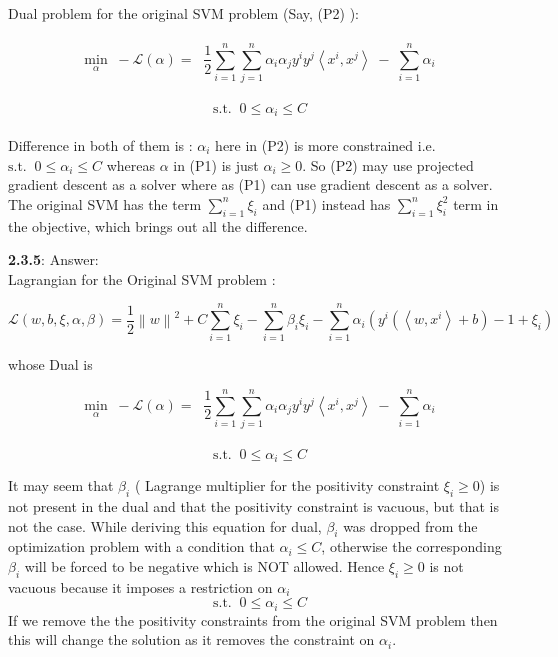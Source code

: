 \documentclass[a4paper,11pt]{article}
\begin{document}
\begin{mlsolution}
Dual problem for the original SVM problem (Say, (P2) ):\\\\
\[
\underset{\alpha}{\text{min}} \;\; - \mathcal{L}\left ( \alpha \right ) = \; \;\frac{1}{2}\sum_{i=1}^{n}\sum_{j=1}^{n}\alpha_{i}\alpha_{j}y^{i}y^{j}\left \langle x^{i}, x^{j} \right \rangle \;-\; \sum_{i=1}^{n}\alpha_{i}
\]\\
\[\text{s.t.} \;\;0 \leq \alpha_{i} \leq C\]\\

Difference in both of them is : $\alpha_{i}$ here in (P2) is more constrained i.e. $\text{s.t.} \;\;0 \leq \alpha_{i} \leq C$ whereas $\alpha$ in (P1) is just $\alpha_{i} \geq 0$. So (P2) may use projected gradient descent as a solver where as (P1) can use gradient descent as a solver.\\

The original SVM has the term $\sum_{i=1}^{n}\xi_{i}$ and (P1) instead has $\sum_{i=1}^{n}\xi_{i}^{2}$ term in the objective, which brings out all the difference.
\newpage

\textbf{2.3.5}: Answer:\\

Lagrangian for the Original SVM problem : 

\[
\mathcal{L}\left ( w, b, \xi, \alpha, \beta \right ) =
\frac{1}{2} \left \| w \right \|^{2} + C \sum_{i=1}^{n} \xi_{i} - \sum_{i=1}^{n} \beta_{i}\xi_{i} - \sum_{i=1}^{n} \alpha_i\left ( y^{i}\left ( \left \langle w, x^{i} \right \rangle + b \right ) - 1 + \xi_{i} \right )
\]

whose Dual is 

\[
\underset{\alpha}{\text{min}} \;\; - \mathcal{L}\left ( \alpha \right ) = \; \;\frac{1}{2}\sum_{i=1}^{n}\sum_{j=1}^{n}\alpha_{i}\alpha_{j}y^{i}y^{j}\left \langle x^{i}, x^{j} \right \rangle \;-\; \sum_{i=1}^{n}\alpha_{i}
\]\\
\[\text{s.t.} \;\;0 \leq \alpha_{i} \leq C\]

It may seem that $\beta_{i}$ ( Lagrange multiplier for the positivity constraint $\xi_{i} \geq 0$) is not present in the dual and that the positivity constraint is vacuous, but that is not the case. While deriving this equation for dual, $\beta_{i}$ was dropped from the optimization problem with a condition that $\alpha_{i} \leq C$, otherwise the corresponding $\beta_{i}$ will be forced to be negative which is NOT allowed. Hence $\xi_{i} \geq 0$ is not vacuous because it imposes a restriction on $\alpha_{i}$ \; \[\text{s.t.} \;\;0 \leq \alpha_{i} \leq C\] If we remove the the positivity constraints from the original SVM problem then this will change the solution as it removes the constraint on $\alpha_{i}$. 
\end{mlsolution}

\begin{mlsolution}


\end{mlsolution}
					
\end{document}
